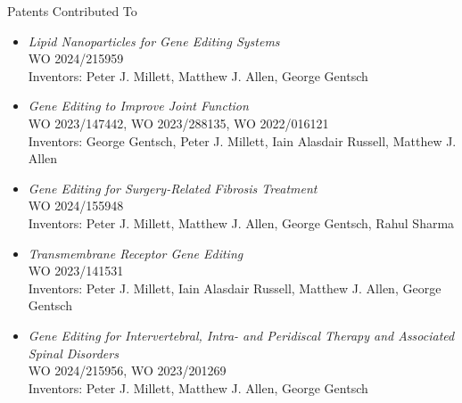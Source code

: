 \documentclass{resume} %
\begin{document}
\begin{rSection}{Patents Contributed To}
\begin{itemize}[leftmargin=1pt]

\item \textit{Lipid Nanoparticles for Gene Editing Systems}\\WO 2024/215959\\Inventors: Peter J. Millett, Matthew J. Allen, George Gentsch

\item \textit{Gene Editing to Improve Joint Function}\\WO 2023/147442, WO 2023/288135, WO 2022/016121 \\Inventors: George Gentsch, Peter J. Millett, Iain Alasdair Russell, Matthew J. Allen

\item \textit{Gene Editing for Surgery-Related Fibrosis Treatment}\\WO 2024/155948\\Inventors: Peter J. Millett, Matthew J. Allen, George Gentsch, Rahul Sharma

\item \textit{Transmembrane Receptor Gene Editing}\\WO 2023/141531\\Inventors: Peter J. Millett, Iain Alasdair Russell, Matthew J. Allen, George Gentsch

\item \textit{Gene Editing for Intervertebral, Intra- and Peridiscal Therapy and Associated Spinal Disorders}\\WO 2024/215956, WO 2023/201269 \\Inventors: Peter J. Millett, Matthew J. Allen, George Gentsch
\end{itemize}

\end{rSection}
\end{document}
